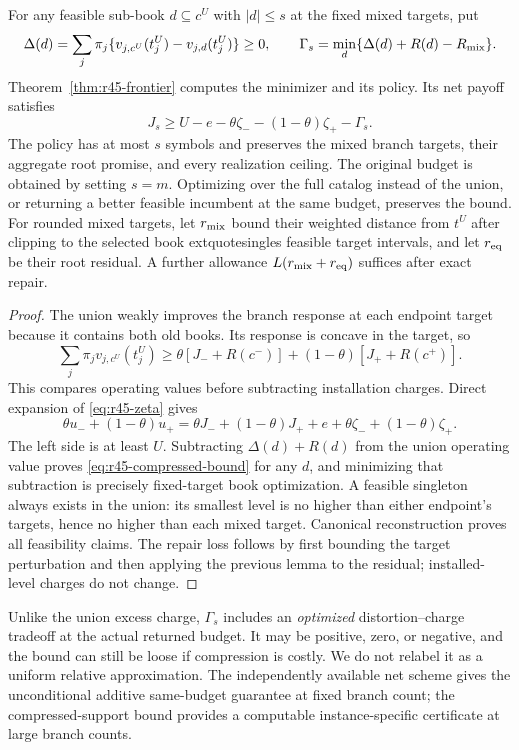 \begin{theorem}\label{thm:r45-inexact}
For any feasible sub-book $d\subseteq c^U$ with $|d|\leq s$ at the fixed mixed targets, put
\[
 \Delta(d)=\sum_j\pi_j\{v_{j,c^U}(t_j^U)-v_{j,d}(t_j^U)\}\geq0,
 \qquad \Gamma_s=\min_d\{\Delta(d)+R(d)-R_{\rm mix}\}.
\]
Theorem~\ref{thm:r45-frontier} computes the minimizer and its policy. Its net payoff satisfies
\begin{equation}\label{eq:r45-compressed-bound}
 J_s\geq U-e-\theta\zeta_--(1-\theta)\zeta_+-\Gamma_s.
\end{equation}
The policy has at most $s$ symbols and preserves the mixed branch targets, their aggregate root promise, and every realization ceiling. The original budget is obtained by setting $s=m$. Optimizing over the full catalog instead of the union, or returning a better feasible incumbent at the same budget, preserves the bound. For rounded mixed targets, let $r_{\rm mix}$ bound their weighted distance from $t^U$ after clipping to the selected book	extquotesingle{}s feasible target intervals, and let $r_{\rm eq}$ be their root residual. A further allowance $L(r_{\rm mix}+r_{\rm eq})$ suffices after exact repair.
\end{theorem}
\begin{proof}
The union weakly improves the branch response at each endpoint target because it contains both old books. Its response is concave in the target, so
\[
 \sum_j\pi_jv_{j,c^U}(t_j^U)
 \geq \theta[J_-+R(c^-)]+(1-\theta)[J_++R(c^+)].
\]
This compares operating values before subtracting installation charges. Direct expansion of \eqref{eq:r45-zeta} gives
\[
 \theta u_-+(1-\theta)u_+
 =\theta J_-+(1-\theta)J_+ +e+
   \theta\zeta_-+(1-\theta)\zeta_+.
\]
The left side is at least $U$. Subtracting $\Delta(d)+R(d)$ from the union operating value proves \eqref{eq:r45-compressed-bound} for any $d$, and minimizing that subtraction is precisely fixed-target book optimization. A feasible singleton always exists in the union: its smallest level is no higher than either endpoint's targets, hence no higher than each mixed target. Canonical reconstruction proves all feasibility claims. The repair loss follows by first bounding the target perturbation and then applying the previous lemma to the residual; installed-level charges do not change.
\end{proof}

Unlike the union excess charge, $\Gamma_s$ includes an \emph{optimized} distortion--charge tradeoff at the actual returned budget. It may be positive, zero, or negative, and the bound can still be loose if compression is costly. We do not relabel it as a uniform relative approximation. The independently available net scheme gives the unconditional additive same-budget guarantee at fixed branch count; the compressed-support bound provides a computable instance-specific certificate at large branch counts.

